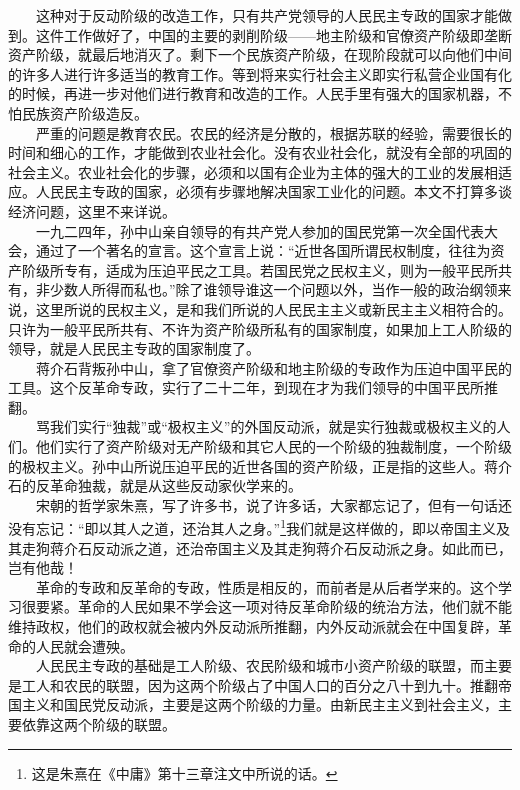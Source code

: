 \documentclass[cn,11pt,chinese]{elegantbook}
\begin{document}
　　这种对于反动阶级的改造工作，只有共产党领导的人民民主专政的国家才能做到。这件工作做好了，中国的主要的剥削阶级——地主阶级和官僚资产阶级即垄断资产阶级，就最后地消灭了。剩下一个民族资产阶级，在现阶段就可以向他们中间的许多人进行许多适当的教育工作。等到将来实行社会主义即实行私营企业国有化的时候，再进一步对他们进行教育和改造的工作。人民手里有强大的国家机器，不怕民族资产阶级造反。\\
　　严重的问题是教育农民。农民的经济是分散的，根据苏联的经验，需要很长的时间和细心的工作，才能做到农业社会化。没有农业社会化，就没有全部的巩固的社会主义。农业社会化的步骤，必须和以国有企业为主体的强大的工业的发展相适应。人民民主专政的国家，必须有步骤地解决国家工业化的问题。本文不打算多谈经济问题，这里不来详说。\\
　　一九二四年，孙中山亲自领导的有共产党人参加的国民党第一次全国代表大会，通过了一个著名的宣言。这个宣言上说：“近世各国所谓民权制度，往往为资产阶级所专有，适成为压迫平民之工具。若国民党之民权主义，则为一般平民所共有，非少数人所得而私也。”除了谁领导谁这一个问题以外，当作一般的政治纲领来说，这里所说的民权主义，是和我们所说的人民民主主义或新民主主义相符合的。只许为一般平民所共有、不许为资产阶级所私有的国家制度，如果加上工人阶级的领导，就是人民民主专政的国家制度了。\\
　　蒋介石背叛孙中山，拿了官僚资产阶级和地主阶级的专政作为压迫中国平民的工具。这个反革命专政，实行了二十二年，到现在才为我们领导的中国平民所推翻。\\
　　骂我们实行“独裁”或“极权主义”的外国反动派，就是实行独裁或极权主义的人们。他们实行了资产阶级对无产阶级和其它人民的一个阶级的独裁制度，一个阶级的极权主义。孙中山所说压迫平民的近世各国的资产阶级，正是指的这些人。蒋介石的反革命独裁，就是从这些反动家伙学来的。\\
　　宋朝的哲学家朱熹，写了许多书，说了许多话，大家都忘记了，但有一句话还没有忘记：“即以其人之道，还治其人之身。”\footnote[11]{ 这是朱熹在《中庸》第十三章注文中所说的话。}我们就是这样做的，即以帝国主义及其走狗蒋介石反动派之道，还治帝国主义及其走狗蒋介石反动派之身。如此而已，岂有他哉！\\
　　革命的专政和反革命的专政，性质是相反的，而前者是从后者学来的。这个学习很要紧。革命的人民如果不学会这一项对待反革命阶级的统治方法，他们就不能维持政权，他们的政权就会被内外反动派所推翻，内外反动派就会在中国复辟，革命的人民就会遭殃。\\
　　人民民主专政的基础是工人阶级、农民阶级和城市小资产阶级的联盟，而主要是工人和农民的联盟，因为这两个阶级占了中国人口的百分之八十到九十。推翻帝国主义和国民党反动派，主要是这两个阶级的力量。由新民主主义到社会主义，主要依靠这两个阶级的联盟。\\
\end{document}
